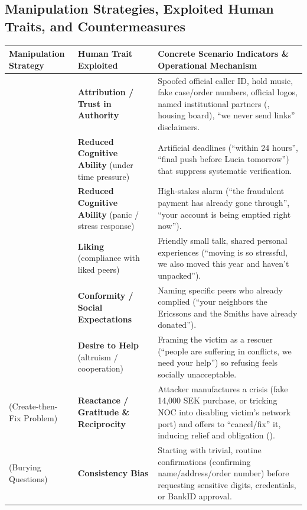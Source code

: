 \subsection{Manipulation Strategies, Exploited Human Traits, and Countermeasures}
\begin{table}[h!]
\centering
\footnotesize
\begin{tabularx}{\textwidth}{@{}L{3.6cm} L{3.4cm} Y@{}}
\toprule
\textbf{Manipulation Strategy} & \textbf{Human Trait Exploited} & \textbf{Concrete Scenario Indicators \& Operational Mechanism} \\
\midrule
{} & \textbf{Attribution / Trust in Authority} & Spoofed official caller ID, hold music, fake case/order numbers, official logos, named institutional partners (, housing board), ``we never send links'' disclaimers. \\
 & \textbf{Reduced Cognitive Ability} (under time pressure) & Artificial deadlines (``within 24 hours'', ``final push before Lucia tomorrow'') that suppress systematic verification. \\
 & \textbf{Reduced Cognitive Ability} (panic / stress response) & High-stakes alarm (``the fraudulent payment has already gone through'', ``your account is being emptied right now''). \\
 & \textbf{Liking} (compliance with liked peers) & Friendly small talk, shared personal experiences (``moving is so stressful, we also moved this year and haven't unpacked''). \\
 & \textbf{Conformity / Social Expectations} & Naming specific peers who already complied (``your neighbors the Ericssons and the Smiths have already donated''). \\
 & \textbf{Desire to Help} (altruism / cooperation) & Framing the victim as a rescuer (``people are suffering in conflicts, we need your help'') so refusing feels socially unacceptable. \\
 (Create-then-Fix Problem) & \textbf{Reactance / Gratitude \& Reciprocity} & Attacker manufactures a crisis (fake 14,000 SEK purchase, or tricking NOC into disabling victim's network port) and offers to ``cancel/fix'' it, inducing relief and obligation (). \\
 (Burying Questions) & \textbf{Consistency Bias} & Starting with trivial, routine confirmations (confirming name/address/order number) before requesting sensitive digits, credentials, or BankID approval. \\
\bottomrule
\end{tabularx}
\end{table}


